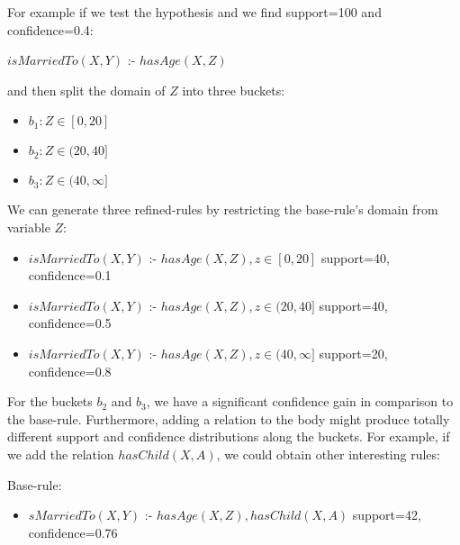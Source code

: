 For example if we test the hypothesis and we find support=100 and confidence=0.4:

\begin{center}
 $isMarriedTo(X,Y)$ :- $hasAge(X,Z)$ 
\end{center}

and then split the domain of $Z$ into three buckets:

\begin{itemize}
 \item $ b_1: Z\in[0,20]$
 \item $ b_2: Z\in(20,40]$
 \item $ b_3: Z\in(40,\infty]$
\end{itemize}

We can generate three refined-rules by restricting the base-rule's domain from variable $Z$:

\begin{itemize}

 \item $isMarriedTo(X,Y)$ :- $hasAge(X,Z), z\in[0,20]$	
    \newline support=40, confidence=0.1
 \item $isMarriedTo(X,Y)$ :- $hasAge(X,Z), z\in(20,40]$	
    \newline support=40, confidence=0.5
 \item $isMarriedTo(X,Y)$ :- $hasAge(X,Z), z\in(40,\infty]$
    \newline support=20, confidence=0.8

\end{itemize}

For the buckets $b_2$ and $b_3$, we have a significant confidence gain in comparison to the base-rule.
Furthermore, adding a relation to the body might produce totally different support and confidence distributions along
the buckets. For example, if we add the relation $hasChild(X,A)$, we could obtain other interesting rules:

Base-rule:
\begin{itemize}
 \item $sMarriedTo(X,Y)$ :- $hasAge(X,Z),hasChild(X,A)$	
    \newline support=42, confidence=0.76
\end{itemize}

